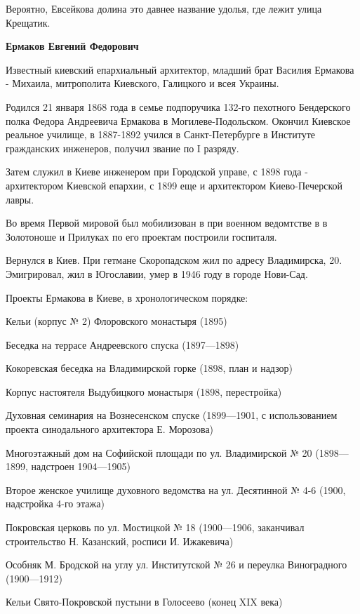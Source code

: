 Вероятно, Евсейкова долина это давнее название удолья, где лежит улица Крещатик.\\

\medskip


\textbf{Ермаков Евгений Федорович} 

Известный киевский епархиальный архитектор, младший брат Василия Ермакова - Михаила, митрополита Киевского, Галицкого и всея Украины.

Родился  21 января 1868 года в семье подпоручика 132-го пехотного Бендерского полка Федора Андреевича Ермакова в Могилеве-Подольском. Окончил Киевское реальное училище, в 1887-1892 учился в Санкт-Петербурге в Институте гражданских инженеров, получил звание по I разряду.

Затем служил в Киеве инженером при Городской управе, с 1898 года - архитектором Киевской епархии, с 1899 еще и архитектором Киево-Печерской лавры.

Во время Первой мировой был мобилизован в при военном ведомтстве в в Золотоноше и Прилуках по его проектам построили госпиталя.

Вернулся в Киев. При гетмане Скоропадском жил по адресу Владимирска, 20. Эмигрировал, жил в Югославии, умер в 1946 году в городе Нови-Сад.

Проекты Ермакова в Киеве, в хронологическом порядке:

Кельи (корпус № 2) Флоровского монастыря (1895)

Беседка на террасе Андреевского спуска (1897—1898)

Кокоревская беседка на Владимирской горке (1898, план и надзор)

Корпус настоятеля Выдубицкого монастыря (1898, перестройка)

Духовная семинария на Вознесенском спуске (1899—1901, с использованием проекта синодального архитектора Е. Морозова)

Многоэтажный дом на Софийской площади по ул. Владимирской № 20 (1898—1899, надстроен 1904—1905)

Второе женское училище духовного ведомства на ул. Десятинной № 4-6 (1900, надстройка 4-го этажа)

Покровская церковь по ул. Мостицкой № 18 (1900—1906, заканчивал строительство Н. Казанский, росписи И. Ижакевича)

Особняк М. Бродской на углу ул. Институтской № 26 и переулка Виноградного (1900—1912)

Кельи Свято-Покровской пустыни в Голосеево (конец XIX века)

